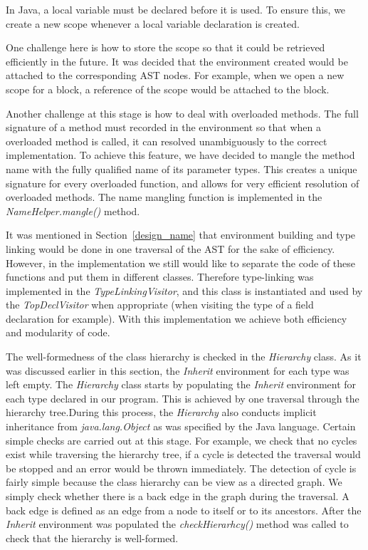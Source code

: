 \documentclass[a4paper, notitlepage]{report}
\begin{document}
In Java, a local variable must be declared before it is used. To ensure this, we create a new scope whenever a local variable declaration is created.

One challenge here is how to store the scope so that it could be retrieved efficiently in the future. It was decided that the environment created would be attached to the corresponding AST nodes. For example, when we open a new scope for a block, a reference of the scope would be attached to the block.

Another challenge at this stage is how to deal with overloaded methods. The full signature of a method must recorded in the environment so that when a overloaded method is called, it can resolved unambiguously to the correct implementation. To achieve this feature, we have decided to mangle the method name with the fully qualified name of its parameter types. This creates a unique signature for every overloaded function, and allows for very efficient resolution of overloaded methods. The name mangling function is implemented in the \emph{NameHelper.mangle()} method.  

It was mentioned in Section~\ref{design_name} that environment building and type linking would be done in one traversal of the AST for the sake of efficiency. However, in the implementation we still would like to separate the code of these functions and put them in different classes. Therefore type-linking was implemented in the \emph{TypeLinkingVisitor}, and this class is instantiated and used by the \emph{TopDeclVisitor} when appropriate (when visiting the type of a field declaration for example). With this implementation we achieve both efficiency and modularity of code.

The well-formedness of the class hierarchy is checked in the \emph{Hierarchy} class. As it was discussed earlier in this section, the \emph{Inherit} environment for each type was left empty. The \emph{Hierarchy} class starts by populating the \emph{Inherit} environment for each type declared in our program. This is achieved by one traversal through the hierarchy tree.During this process, the \emph{Hierarchy} also conducts implicit inheritance from \emph{java.lang.Object} as was specified by the Java language. Certain simple checks are carried out at this stage. For example, we check that no cycles exist while traversing the hierarchy tree, if a cycle is detected the traversal would be stopped and an error would be thrown immediately. The detection of cycle is fairly simple because the class hierarchy can be view as a directed graph. We simply check whether there is a back edge in the graph during the traversal. A back edge is defined as an edge from a node to itself or to its ancestors. After the \emph{Inherit} environment was populated the \emph{checkHierarhcy()} method was called to check that the hierarchy is well-formed.
\end{document}

